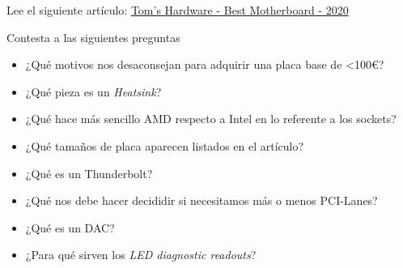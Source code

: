 \documentclass[11pt]{article}
\begin{document}
Lee el siguiente artículo: \href{https://www.tomshardware.com/reviews/motherboard-buying-guide,5682.html}{Tom's Hardware - Best Motherboard - 2020}

Contesta a las siguientes preguntas

\begin{itemize}
\item ¿Qué motivos nos desaconsejan para adquirir una placa base de <100€?
\item ¿Qué pieza es un \emph{Heatsink}?
\item ¿Qué hace más sencillo AMD respecto a Intel en lo referente a los sockets?
\item ¿Qué tamaños de placa aparecen listados en el artículo?
\item ¿Qué es un Thunderbolt?
\item ¿Qué nos debe hacer decididir si necesitamos más o menos PCI-Lanes?
\item ¿Qué es un DAC?
\item ¿Para qué sirven los \emph{LED diagnostic readouts}?
\end{itemize}
\end{document}
